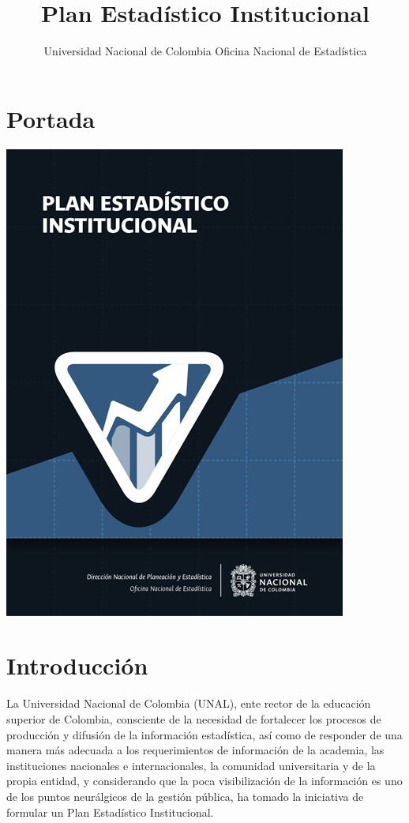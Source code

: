 \documentclass[
]{book}
\title{Plan Estadístico Institucional}
\author{ Universidad Nacional de Colombia Oficina Nacional de Estadística}
\date{}
\begin{document}
\maketitle

{
\setcounter{tocdepth}{1}
\tableofcontents
}
\hypertarget{portada}{%
\chapter*{Portada}\label{portada}}

\begin{center}\includegraphics[width=0.75\linewidth]{Imagenes/Portada Final} \end{center}

\hypertarget{intro}{%
\chapter{Introducción}\label{intro}}

La Universidad Nacional de Colombia (UNAL), ente rector de la educación superior de Colombia, consciente de la necesidad de fortalecer los procesos de producción y difusión de la información estadística, así como de responder de una manera más adecuada a los requerimientos de información de la academia, las instituciones nacionales e internacionales, la comunidad universitaria y de la propia entidad, y considerando que la poca visibilización de la información es uno de los puntos neurálgicos de la gestión pública, ha tomado la iniciativa de formular un Plan Estadístico Institucional.
\end{document}
